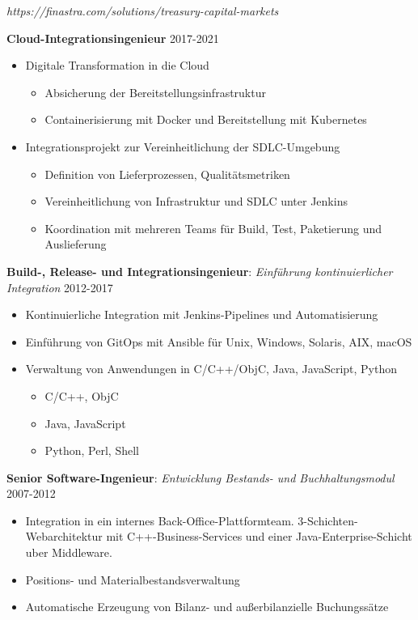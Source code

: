\documentclass[11pt,a4paper]{moderncv}
\begin{document}
{
\textit{https://finastra.com/solutions/treasury-capital-markets}
\bigskip

\textbf{Cloud-Integrationsingenieur} \hfill 2017-2021
\bigskip
	\begin{itemize}%
		\item Digitale Transformation in die Cloud
			\begin{itemize}%
				\item Absicherung der Bereitstellungsinfrastruktur
				\item Containerisierung mit Docker und Bereitstellung mit Kubernetes
			\end{itemize}
	\end{itemize}
\bigskip
	\begin{itemize}%
	\item	Integrationsprojekt zur Vereinheitlichung der SDLC-Umgebung
		\begin{itemize}%
				\item Definition von Lieferprozessen, Qualitätsmetriken
				\item Vereinheitlichung von Infrastruktur und SDLC unter Jenkins
				\item Koordination mit mehreren Teams für Build, Test, Paketierung und Auslieferung
		\end{itemize}
	\end{itemize}
\bigskip
 \textbf{Build-, Release- und Integrationsingenieur}: \textit{Einführung kontinuierlicher Integration} \hfill 2012-2017
\bigskip
			\begin{itemize}%
				\item Kontinuierliche Integration mit Jenkins-Pipelines und Automatisierung
                \item Einführung von GitOps mit Ansible für Unix, Windows, Solaris, AIX, macOS
				\item Verwaltung von Anwendungen in C/C++/ObjC, Java, JavaScript, Python
					\begin{itemize}
						\item C/C++, ObjC
						\item Java, JavaScript
						\item Python, Perl, Shell
					\end{itemize}
				\end{itemize}
\bigskip
\textbf{Senior Software-Ingenieur}: \textit{Entwicklung Bestands- und Buchhaltungsmodul} \hfill 2007-2012

\bigskip
			\begin{itemize}
				\item Integration in ein internes Back-Office-Plattformteam. 3-Schichten-Webarchitektur mit C++-Business-Services und einer Java-Enterprise-Schicht uber Middleware.
				\item Positions- und Materialbestandsverwaltung
				\item Automatische Erzeugung von Bilanz- und außerbilanzielle Buchungssätze
			\end{itemize}
}
\end{document}
